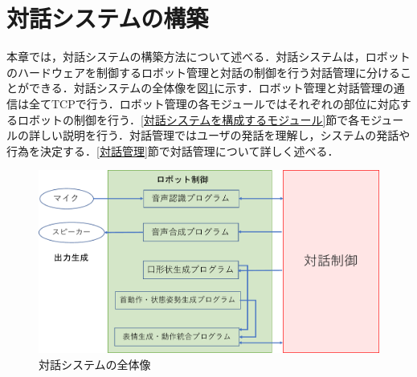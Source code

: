 \section{対話システムの構築}
\label{対話システムの構築}
本章では，対話システムの構築方法について述べる．対話システムは，ロボットのハードウェアを制御するロボット管理と対話の制御を行う対話管理に分けることができる．対話システムの全体像を図\ref{overview_system}に示す．ロボット管理と対話管理の通信は全てTCPで行う．ロボット管理の各モジュールではそれぞれの部位に対応するロボットの制御を行う．\ref{対話システムを構成するモジュール}節で各モジュールの詳しい説明を行う．対話管理ではユーザの発話を理解し，システムの発話や行為を決定する．\ref{対話管理}節で対話管理について詳しく述べる．

\begin{figure}[th]
    \centering
    \includegraphics[scale=0.5]{pic/overview_system.pdf}
    \caption{対話システムの全体像}
    \label{overview_system}
\end{figure}

